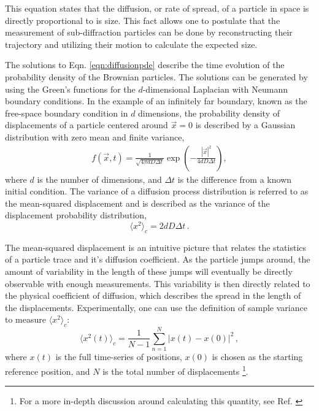 This equation states that the diffusion, or rate of spread, of a particle in space is directly proportional to is size. This fact allows one to postulate that the measurement of sub-diffraction particles can be done by reconstructing their trajectory and utilizing their motion to calculate the expected size. 

The solutions to Eqn. \ref{eqn:diffusionpde} describe the time evolution of the probability density of the Brownian particles. The solutions can be generated by using the Green's functions for the $d$-dimensional Laplacian with Neumann boundary conditions. In the example of an infinitely far boundary, known as the free-space boundary condition in $d$ dimensions, the probability density of displacements of a particle centered around $\vec{x} = 0$ is described by a Gaussian distribution with zero mean and finite variance,
\begin{eqnarray} \label{eqn:freespacebrown}
    f(\vec{x},t) = \frac{1}{\sqrt{4\pi d D \Delta t }} \exp \left({-\frac{|\vec{x}|^2}{4d D\Delta t}}\right),
\end{eqnarray}
where $d$ is the number of dimensions, and $\Delta t$ is the difference from a known initial condition.  The variance of a diffusion process distribution is referred to as the mean-squared displacement and is described as the variance of the displacement probability distribution,
\begin{equation}\label{eqn:msd_disp}
    \langle x^2 \rangle_c = 2d D \Delta t\,.
\end{equation}

The mean-squared displacement is an intuitive picture that relates the statistics of a particle trace and it's diffusion coefficient. As the particle jumps around, the amount of variability in the length of these jumps will eventually be directly observable with enough measurements. This variability is then directly related to the physical coefficient of diffusion, which describes the spread in the length of the displacements. Experimentally, one can use the definition of sample variance to measure $\langle x^2 \rangle_c$:
\begin{equation}\label{eqn:sample_variance}
    \langle x^2(t) \rangle_c = \frac{1}{N-1}\sum_{n=1}^{N}\left|x(t) - x(0)\right|^2\,,
\end{equation}
where $x(t)$ is the full time-series of positions, $x(0)$ is chosen as the starting reference position, and $N$ is the total number of displacements \footnote{For a more in-depth discussion around calculating this quantity, see Ref. \cite{bian111YearsBrownian2016}}.

